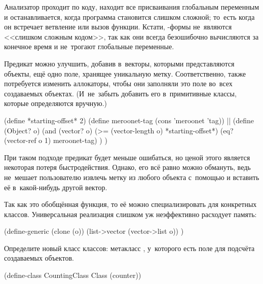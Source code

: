 Анализатор проходит по коду, находит все присваивания глобальным переменным и
останавливается, когда программа становится слишком сложной; то~есть когда он
встречает ветвление или вызов функции. Кстати, -формы не~являются
<<слишком сложным кодом>>, так как они всегда безошибочно вычисляются за
конечное время и не~трогают глобальные переменные.




Предикат  можно улучшить, добавив в~векторы, которыми представляются
объекты, ещё одно поле, хранящее уникальную метку. Соответственно, также
потребуется изменить аллокаторы, чтобы они заполняли это поле во~всех
создаваемых объектах. (И~не~забыть добавить его в~примитивные классы, которые
определяются вручную.)

\begin{code:lisp}
(define *starting-offset* 2)
(define meroonet-tag (cons 'meroonet 'tag))
||
(define (Object? o)
  (and (vector? o)
       (>= (vector-length o) *starting-offset*)
       (eq? (vector-ref o 1) meroonet-tag) ) )
\end{code:lisp}

При таком подходе предикат  будет меньше ошибаться, но ценой этого
является некоторая потеря быстродействия. Однако, его всё равно можно обмануть,
ведь не~мешает пользователю извлечь метку из любого объекта с~помощью
 и вставить её в~какой-нибудь другой вектор.



Так как это обобщённая функция, то её можно специализировать для конкретных
классов. Универсальная реализация слишком уж неэффективно расходует память:

\begin{code:lisp}
(define-generic (clone (o))
  (list->vector (vector->list o)) )
\end{code:lisp}



Определите новый класс классов: метакласс , у~которого есть
поле для подсчёта создаваемых объектов.

\begin{code:lisp}
(define-class CountingClass Class (counter))
\end{code:lisp}

